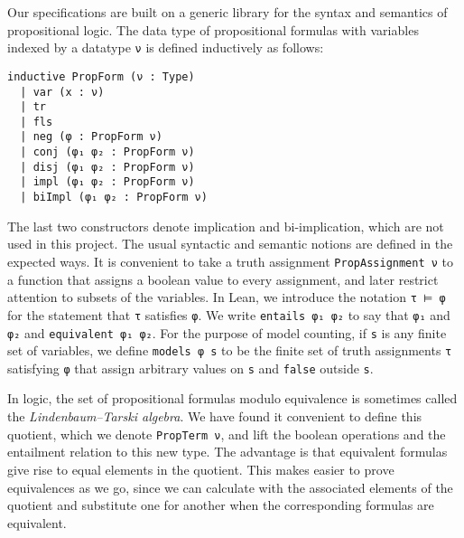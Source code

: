 Our specifications are built on a generic library for the syntax and semantics of
propositional logic. The data type of propositional formulas with variables indexed by
a datatype \lstinline{ν} is defined inductively as follows:
\begin{lstlisting}
inductive PropForm (ν : Type)
  | var (x : ν)
  | tr
  | fls
  | neg (φ : PropForm ν)
  | conj (φ₁ φ₂ : PropForm ν)
  | disj (φ₁ φ₂ : PropForm ν)
  | impl (φ₁ φ₂ : PropForm ν)
  | biImpl (φ₁ φ₂ : PropForm ν)
\end{lstlisting}
The last two constructors denote implication and bi-implication, which are not used in this
project. The usual syntactic and semantic notions are defined in the expected ways.
It is convenient to take a truth assignment \lstinline{PropAssignment ν} to a function that
assigns a boolean value to every assignment, and later restrict attention to subsets of the
variables. In Lean, we introduce the notation \lstinline{τ ⊨ φ} for the statement that
\lstinline{τ} satisfies \lstinline{φ}. We write \lstinline{entails φ₁ φ₂} to say that
\lstinline{φ₁} and \lstinline{φ₂} and \lstinline{equivalent φ₁ φ₂}.
For the purpose of model counting, if \lstinline{s} is any finite set of variables,
we define \lstinline{models φ s} to be the finite set of truth assignments \lstinline{τ}
satisfying \lstinline{φ} that assign arbitrary values on \lstinline{s} and
\lstinline{false} outside \lstinline{s}.

In logic, the set of propositional formulas modulo equivalence is sometimes called the
\emph{Lindenbaum--Tarski algebra}. We have found it convenient to define this quotient,
which we denote \lstinline{PropTerm ν}, and lift the boolean operations and the entailment
relation to this new type. The advantage is that equivalent formulas give
rise to equal elements in the quotient.
This makes easier to prove equivalences as we go, since we can calculate with the associated
elements of the quotient and substitute one for another when the corresponding formulas are equivalent.


